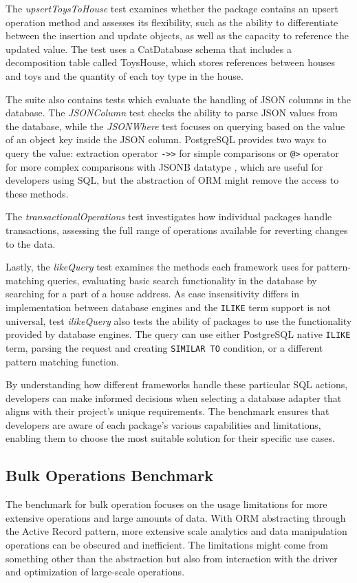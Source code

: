 The \textit{upsertToysToHouse} test examines whether the package contains an
upsert operation method and assesses its flexibility, such as the ability to
differentiate between the insertion and update objects, as well as the capacity
to reference the updated value. The test uses a CatDatabase schema that includes
a decomposition table called ToysHouse, which stores references between houses
and toys and the quantity of each toy type in the house.

The suite also contains tests which evaluate the handling of JSON columns in the
database. The \textit{JSONColumn} test checks the ability to parse JSON values
from the database, while the \textit{JSONWhere} test focuses on querying based
on the value of an object key inside the JSON column. PostgreSQL provides two
ways to query the value: extraction operator \texttt{->>} for simple comparisons
or \texttt{@>} operator for more complex comparisons with JSONB datatype
\cite{postgres-json}, which are useful for developers using SQL, but the
abstraction of ORM might remove the access to these methods.

The \textit{transactionalOperations} test investigates how individual packages
handle transactions, assessing the full range of operations available for
reverting changes to the data.

Lastly, the \textit{likeQuery} test examines the methods each framework uses for
pattern-matching queries, evaluating basic search functionality in the database
by searching for a part of a house address. As case insensitivity differs in
implementation between database engines and the \texttt{ILIKE} term support is
not universal, test \textit{ilikeQuery} also tests the ability of packages to
use the functionality provided by database engines. The query can use either
PostgreSQL native \texttt{ILIKE} term, parsing the request and creating
\texttt{SIMILAR TO} condition, or a different pattern matching function. 

By understanding how different frameworks handle these particular SQL actions,
developers can make informed decisions when selecting a database adapter that
aligns with their project's unique requirements. The benchmark ensures that
developers are aware of each package's various capabilities and limitations,
enabling them to choose the most suitable solution for their specific use cases.

\subsection*{Bulk Operations Benchmark}
The benchmark for bulk operation focuses on the usage limitations for more
extensive operations and large amounts of data. With ORM abstracting through the
Active Record pattern, more extensive scale analytics and data manipulation
operations can be obscured and inefficient. The limitations might come from
something other than the abstraction but also from interaction with the driver
and optimization of large-scale operations.

